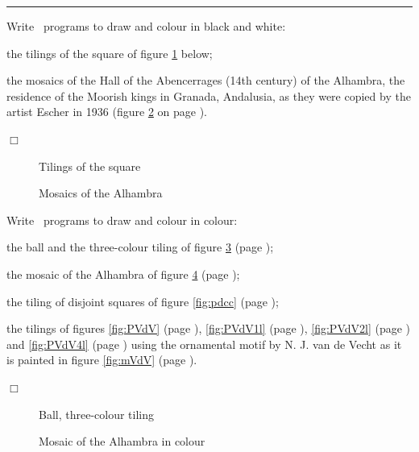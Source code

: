 \noindent \rule{137mm}{0.1mm}\par\nopagebreak %
\begin{exercices}{Write \python\ programs to draw and colour in black and white:

\tiret the tilings of the square of figure \ref{fig:pavac} below;

\tiret the mosaics of the Hall of the Abencerrages (14th century) of the Al\-ham\-bra,
the residence of the Moorish kings in Granada, Andalusia, as they were copied
by the artist Escher in 1936 \cite{escher1} (figure \ref{fig:mosAlham} on page \pageref{fig:mosAlham}).

\noindent $\Box$}\end{exercices}
\begin{figure}[htbp]
 \caption{Tilings of the square}\label{fig:pavac}
\end{figure}
\begin{figure}[htbp]
 \caption{Mosaics of the Alhambra}\label{fig:mosAlham}
\end{figure}
\begin{exercices}{Write \python\ programs to draw and colour in col\-our:

\tiret the ball and the three-colour tiling of figure \ref{fig:balpav} (page \pageref{fig:balpav});

\tiret the mosaic of the Al\-ham\-bra \cite{escher1} of figure \ref{fig:mosai4}
        (page \pageref{fig:mosai4});

\tiret the tiling of disjoint squares of figure \ref{fig:pdcc} (page \pageref{fig:pdcc});

\tiret the tilings of figures
\ref{fig:PVdV} (page \pageref{fig:PVdV}),
\ref{fig:PVdV1l} (page \pageref{fig:PVdV1l}),
\ref{fig:PVdV2l} (page \pageref{fig:PVdV2l})
and
\ref{fig:PVdV4l} (page \pageref{fig:PVdV4l})
using the ornamental motif by N. J. van de Vecht as it is
painted in figure \ref{fig:mVdV} (page \pageref{fig:mVdV}).

\noindent $\Box$}\end{exercices}
\begin{figure}[htbp]
 \caption{Ball, three-colour tiling}\label{fig:balpav}
\end{figure}
\vfill
\begin{figure}[htbp]
 \caption{Mosaic of the Alhambra in colour}\label{fig:mosai4}
\end{figure}
